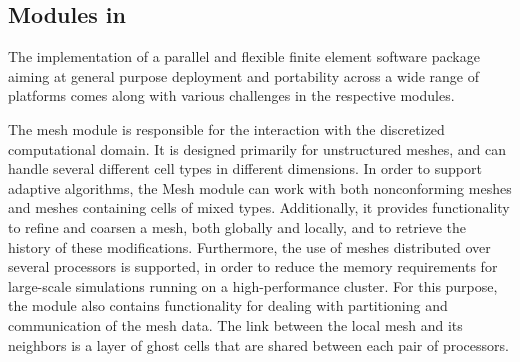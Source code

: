 \subsection{Modules in \hiflow{}}
The implementation of a parallel and flexible finite element software package
aiming at general purpose deployment and portability across a wide range of
platforms comes along with various challenges in the respective
modules. 

The mesh module is responsible for the interaction with the
discretized computational domain. It is designed primarily for
unstructured meshes, and can handle several different cell types in
different dimensions. In order to support adaptive algorithms, the
Mesh module can work with both nonconforming meshes and meshes
containing cells of mixed types. Additionally, it provides
functionality to refine and coarsen a mesh, both globally and locally,
and to retrieve the history of these modifications. Furthermore, the
use of meshes distributed over several processors is supported, in
order to reduce the memory requirements for large-scale simulations
running on a high-performance cluster. For this purpose, the module
also contains functionality for dealing with partitioning and
communication of the mesh data. The link between the local mesh and
its neighbors is a layer of ghost cells that are
shared between each pair of processors.

